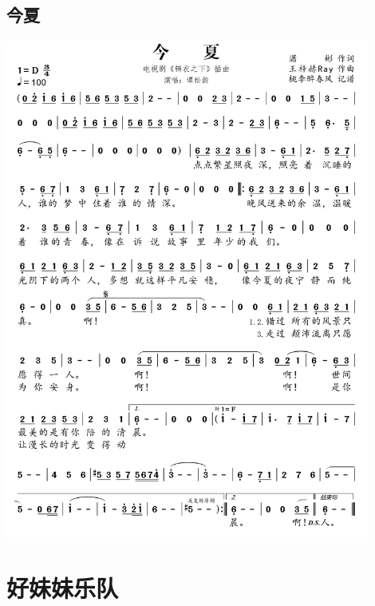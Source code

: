 \documentclass[cn,pad,twocol]{elegantbook}
\begin{document}
\section{今夏} \includegraphics[width=0.9\textwidth]{rpi400/20210212今夏.png}

\chapter{好妹妹乐队}
\end{document}
